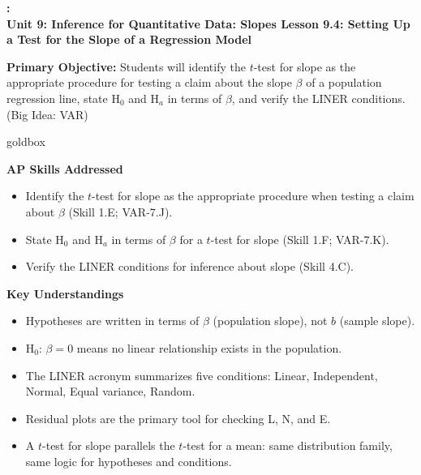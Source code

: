 \documentclass[10pt]{article}
\newcommand{\UnitNumberName}{Unit 9: Inference for Quantitative Data: Slopes \quad}
\newcommand{\LessonNumberName}{Lesson 9.4: Setting Up a Test for the Slope of a Regression Model}
\begin{document}
\begin{center}
    {\Large\bfseries \CourseName: \SchoolYear \\
    {\small\bfseries \UnitNumberName \LessonNumberName}}
\end{center}

\begin{tcolorbox}[colback=sky, colframe=navy, boxrule=0.9pt, arc=2mm,
    left=2mm, right=2mm, top=1.5mm, bottom=1.5mm]
    \textbf{Primary Objective:} Students will identify the $t$-test for slope as the
    appropriate procedure for testing a claim about the slope $\beta$ of a population
    regression line, state H$_0$ and H$_a$ in terms of $\beta$, and verify the LINER
    conditions. (Big Idea: VAR)
\end{tcolorbox}

\renewcommand{\arraystretch}{1.6}
\begin{skillbox}{goldbox}
\begin{minipage}[t]{0.48\linewidth}
    \textbf{AP Skills Addressed}
    \begin{itemize}
        \item Identify the $t$-test for slope as the appropriate procedure when testing
              a claim about $\beta$ (Skill 1.E; VAR-7.J).
        \item State H$_0$ and H$_a$ in terms of $\beta$ for a $t$-test for slope
              (Skill 1.F; VAR-7.K).
        \item Verify the LINER conditions for inference about slope (Skill 4.C).
    \end{itemize}
\end{minipage}
\hfill
\begin{minipage}[t]{0.48\linewidth}
    \textbf{Key Understandings}
    \begin{itemize}
        \item Hypotheses are written in terms of $\beta$ (population slope), not $b$
              (sample slope).
        \item H$_0$: $\beta = 0$ means no linear relationship exists in the population.
        \item The LINER acronym summarizes five conditions: Linear, Independent, Normal,
              Equal variance, Random.
        \item Residual plots are the primary tool for checking L, N, and E.
        \item A $t$-test for slope parallels the $t$-test for a mean: same distribution
              family, same logic for hypotheses and conditions.
    \end{itemize}
\end{minipage}
\end{skillbox}
\end{document}
